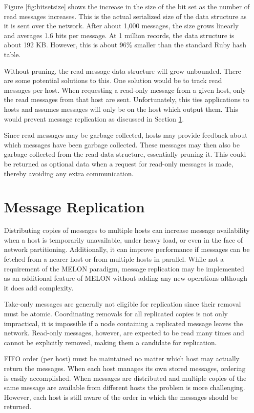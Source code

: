 Figure \ref{fig:bitsetsize} shows the increase in the size of the bit set as the number of read messages increases. This is the actual serialized size of the data structure as it is sent over the network. After about 1,000 messages, the size grows linearly and averages 1.6 bits per message. At 1 million records, the data structure is about 192 KB. However, this is about 96\% smaller than the standard Ruby hash table.

Without pruning, the read message data structure will grow unbounded. There are some potential solutions to this. One solution would be to track read messages per host. When requesting a read-only message from a given host, only the read messages from that host are sent. Unfortunately, this ties applications to hosts and assumes messages will only be on the host which output them. This would prevent message replication as discussed in Section \ref{sec:replication}.

Since read messages may be garbage collected, hosts may provide feedback about which messages have been garbage collected. These messages may then also be garbage collected from the read data structure, essentially pruning it. This could be returned as optional data when a request for read-only messages is made, thereby avoiding any extra communication.

\section{Message Replication}\label{sec:replication}

Distributing copies of messages to multiple hosts can increase message availability when a host is temporarily unavailable, under heavy load, or even in the face of network partitioning. Additionally, it can improve performance if messages can be fetched from a nearer host or from multiple hosts in parallel. While not a requirement of the MELON paradigm, message replication may be implemented as an additional feature of MELON without adding any new operations although it does add complexity.

Take-only messages are generally not eligible for replication since their removal must be atomic. Coordinating removals for all replicated copies is not only impractical, it is impossible if a node containing a replicated message leaves the network. Read-only messages, however, are expected to be read many times and cannot be explicitly removed, making them a candidate for replication.

FIFO order (per host) must be maintained no matter which host may actually return the messages. When each host manages its own stored messages, ordering is easily accomplished. When messages are distributed and multiple copies of the same message are available from different hosts the problem is more challenging. However, each host is still aware of the order in which the messages should be returned.

